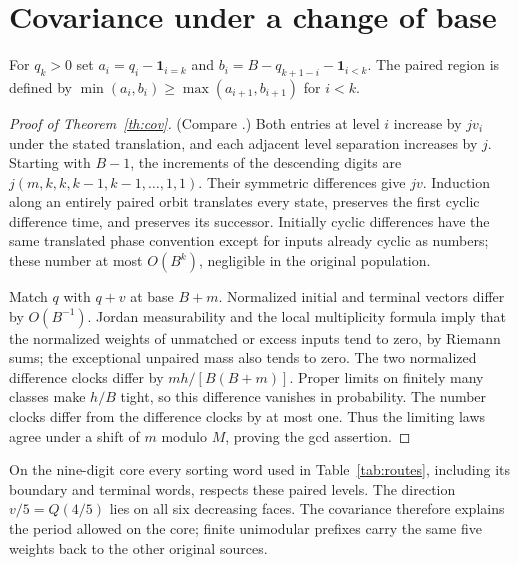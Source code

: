 \documentclass[11pt,reqno]{amsart}
\begin{document}
\section{Covariance under a change of base}\label{sec:cov}
For $q_k>0$ set $a_i=q_i-\boldsymbol1_{i=k}$ and
$b_i=B-q_{k+1-i}-\boldsymbol1_{i<k}$. The paired region is defined by
$\min(a_i,b_i)\ge\max(a_{i+1},b_{i+1})$ for $i<k$.
\begin{proof}[Proof of Theorem~\ref{th:cov}]
(Compare \cite[Remark~4.3]{thakur}.) Both entries at level $i$ increase by $jv_i$ under the stated translation,
and each adjacent level separation increases by $j$. Starting with $B-1$,
the increments of the descending digits are $j(m,k,k,k-1,k-1,\ldots,1,1)$.
Their symmetric differences give $jv$. Induction along an entirely paired
orbit translates every state, preserves the first cyclic difference time,
and preserves its successor. Initially cyclic differences have the same
translated phase convention except for inputs already cyclic as numbers;
these number at most $O(B^k)$, negligible in the original population.

Match $q$ with $q+v$ at base $B+m$. Normalized initial and terminal vectors
differ by $O(B^{-1})$. Jordan measurability and the local multiplicity
formula imply that the normalized weights of unmatched or excess inputs
tend to zero, by Riemann sums; the exceptional unpaired mass also tends
to zero. The two normalized difference clocks differ by $mh/[B(B+m)]$.
Proper limits on finitely many classes make $h/B$ tight, so this difference
vanishes in probability. The number clocks differ from the difference clocks
by at most one. Thus the limiting laws agree under a shift of $m$ modulo
$M$, proving the gcd assertion.
\end{proof}
On the nine-digit core every sorting word used in Table~\ref{tab:routes},
including its boundary and terminal words, respects these paired levels.
The direction $v/5=Q(4/5)$ lies on all six decreasing faces. The covariance
therefore explains the period allowed on the core; finite unimodular
prefixes carry the same five weights back to the other original sources.

\appendix
\end{document}
